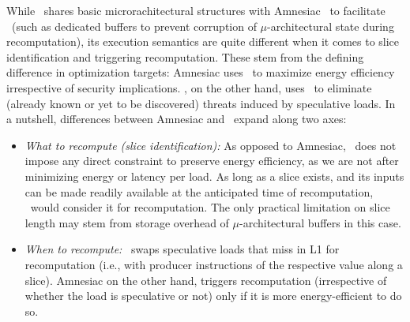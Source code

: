 While \arch\ shares basic microrachitectural structures with Amnesiac~\cite{amnesiac17} to facilitate \recomp\ (such as dedicated buffers to prevent corruption of $\mu$-architectural state during recomputation), its
execution semantics are quite different when it comes to slice identification and triggering recomputation.
These stem from the defining difference in optimization targets: Amnesiac uses \recomp\ to maximize energy efficiency irrespective of security implications. \arch, on the other hand, uses \recomp\ to eliminate (already known or yet to be discovered) threats induced by speculative loads. 
In a nutshell, differences between Amnesiac and \arch\ expand along two axes:
 \begin{itemize}
     \item{\em What to recompute (slice identification):} As opposed to Amnesiac, \arch\ does not impose any direct constraint 
     to preserve energy efficiency,  as we are not after minimizing energy or latency per load. As long as a slice exists, and its inputs can be made readily available at the anticipated time of recomputation, \arch\ would consider it for recomputation. The only practical limitation on slice length may stem from storage overhead of $\mu$-architectural buffers in this case. 
     \item {\em When to recompute:} \arch\ swaps speculative loads that miss in L1 for recomputation (i.e., with producer instructions of the respective value along a slice). Amnesiac on the other hand, triggers recomputation (irrespective of whether the load is speculative or not) only if it is more energy-efficient to do so. 
 \end{itemize}
 

